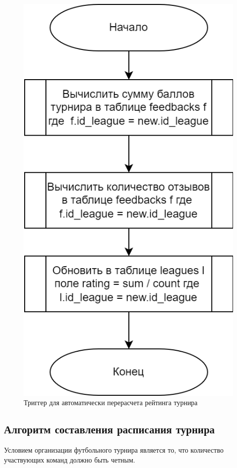\begin{figure}[h]
	\centering
	\includegraphics[height=0.4\textheight]{img/trigger.png}
	\caption{Триггер для автоматически перерасчета рейтинга турнира}
	\label{img:trigger}
\end{figure}

\subsection{Алгоритм составления расписания турнира}

Условием организации футбольного турнира является то, что количество участвующих команд должно быть четным.

